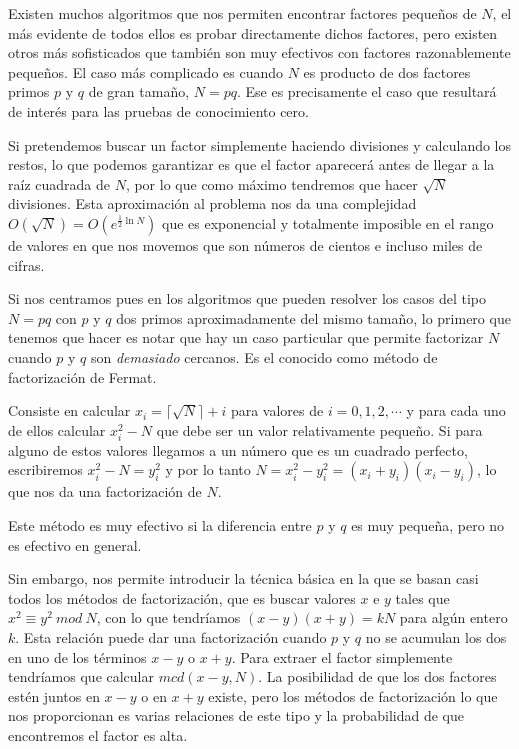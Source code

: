\hfil

Existen muchos algoritmos que nos permiten encontrar factores peque\~nos de $N$,
el m\'as evidente de todos ellos es probar directamente dichos factores, pero existen otros
m\'as sofisticados que tambi\'en son muy efectivos con factores razonablemente
peque\~nos. El caso m\'as complicado es cuando $N$ es producto de dos factores primos $p$ y $q$
de gran tama\~no, $N = pq$. Ese es precisamente el caso que resultar\'a de
inter\'es para las pruebas de conocimiento cero.

Si pretendemos buscar un factor simplemente haciendo divisiones y calculando los
restos, lo que podemos garantizar es que el factor aparecer\'a antes de llegar a
la ra\'iz cuadrada de $N$, por lo que como m\'aximo tendremos que hacer $\sqrt{N}$
divisiones. Esta aproximaci\'on al problema nos da una complejidad
$O(\sqrt{N}) = O(e^{\frac{1}{2}\ln N})$ que es exponencial y totalmente imposible
en el rango de valores en que nos movemos que son n\'umeros de cientos e incluso
miles de cifras.

Si nos centramos pues en los algoritmos que pueden resolver los casos del tipo
$N = pq$ con $p$ y $q$ dos primos aproximadamente del mismo tama\~no, lo primero que tenemos que
hacer es notar que hay un caso particular que permite factorizar $N$ cuando $p$
y $q$ son {\em demasiado} cercanos. Es el conocido como m\'etodo de factorizaci\'on
de Fermat.

Consiste en calcular $x_i = \lceil\sqrt{N}\rceil + i$ para valores de $i = 0,1,2,\cdots$
y para cada uno de ellos calcular $x_i^2 - N$ que debe ser un valor relativamente peque\~no.
Si para alguno de estos valores llegamos a un n\'umero que es un cuadrado perfecto,
escribiremos $x_i^2 - N = y_i^2$ y por lo tanto $N = x_i^2 - y_i^2 =
(x_i + y_i)(x_i - y_i)$, lo que nos da una factorizaci\'on de $N$.

Este m\'etodo es muy efectivo si la diferencia entre $p$ y $q$ es muy peque\~na, pero no
es efectivo en general.

Sin embargo, nos permite introducir la t\'ecnica b\'asica en la que se basan casi
todos los m\'etodos de factorizaci\'on, que es buscar valores $x$ e $y$ tales que
$x^2 \equiv y^2 ~mod~N$, con lo que tendr\'iamos $(x-y)(x+y) = kN$ para alg\'un entero $k$.
Esta relaci\'on puede dar una factorizaci\'on cuando $p$ y $q$ no se acumulan los dos en
uno de los t\'erminos $x-y$ o $x+y$. Para extraer el factor simplemente tendr\'iamos que
calcular $mcd(x-y,N)$. La posibilidad de que los dos factores est\'en juntos en $x-y$ o
en $x+y$ existe, pero los m\'etodos de factorizaci\'on lo que nos proporcionan es
varias relaciones de este tipo y la probabilidad de que encontremos el factor es alta.

